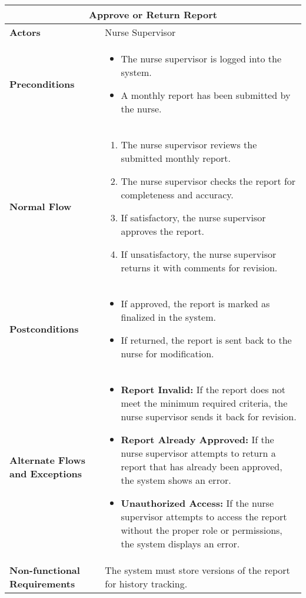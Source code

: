 \documentclass{article}
\begin{document}
\begin{longtable}{| p{5cm} | p{10cm} |}
    \hline
    \multicolumn{2}{|c|}{\textbf{Approve or Return Report}} \\
    \hline
    \textbf{Actors} & Nurse Supervisor \\
    \hline
    \textbf{Preconditions} & 
    \begin{itemize}
        \item The nurse supervisor is logged into the system.
        \item A monthly report has been submitted by the nurse.
    \end{itemize} \\
    \hline
    \textbf{Normal Flow} & 
    \begin{enumerate}
        \item The nurse supervisor reviews the submitted monthly report.
        \item The nurse supervisor checks the report for completeness and accuracy.
        \item If satisfactory, the nurse supervisor approves the report.
        \item If unsatisfactory, the nurse supervisor returns it with comments for revision.
    \end{enumerate} \\
    \hline
    \textbf{Postconditions} & 
    \begin{itemize}
        \item If approved, the report is marked as finalized in the system.
        \item If returned, the report is sent back to the nurse for modification.
    \end{itemize} \\
    \hline
    \textbf{Alternate Flows and Exceptions} & 
    \begin{itemize}
        \item \textbf{Report Invalid:} If the report does not meet the minimum required criteria, the nurse supervisor sends it back for revision.
        \item \textbf{Report Already Approved:} If the nurse supervisor attempts to return a report that has already been approved, the system shows an error.
        \item \textbf{Unauthorized Access:} If the nurse supervisor attempts to access the report without the proper role or permissions, the system displays an error.
    \end{itemize} \\
    \hline
    \textbf{Non-functional Requirements} & The system must store versions of the report for history tracking. \\
    \hline
\end{longtable}
\end{document}
